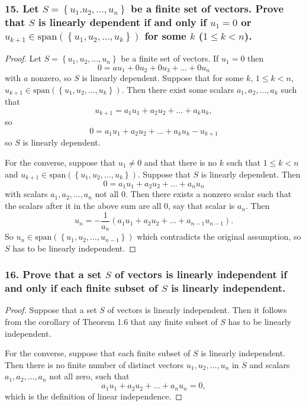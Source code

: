 \documentclass{article}
\begin{document}
\subsubsection*{15. Let $S = \left\{u_1. u_2, \dots, u_n\right\}$ be a finite set of vectors. Prove that $S$ is linearly dependent if and only if $u_1 = 0$ or $u_{k+1}\in \text{span}(\left\{u_1, u_2, \dots, u_k\right\})$ for some $k$ ($1 \le k < n$).}
\begin{proof}
	Let $S = \left\{u_1, u_2, \dots, u_n\right\}$ be a finite set of vectors. If $u_1 = 0$ then \[0 = au_1 + 0u_2 + 0u_3 + \dots + 0u_n\] with $a$ nonzero, so $S$ is linearly dependent. Suppose that for some $k$, $1 \le k < n$, $u_{k+1} \in \text{span}(\left\{u_1, u_2, \dots, u_k\right\})$. Then there exist some scalars $a_1, a_2, \dots, a_k$ such that \[u_{k+1} = a_1u_1 + a_2u_2 + \dots + a_ku_k,\] so \[0 = a_1u_1 + a_2u_2 + \dots + a_ku_k - u_{k+1}\] so $S$ is linearly dependent.

	For the converse, suppose that $u_1 \ne 0$ and that there is no $k$ such that $1 \le k < n$ and $u_{k+1} \in \text{span}(\left\{u_1, u_2, \dots, u_k\right\})$. Suppose that $S$ is linearly dependent. Then \[0 = a_1u_1 + a_2u_2 + \dots + a_nu_n\] with scalars $a_1, a_2, \dots, a_n$ not all $0$. Then there exists a nonzero scalar such that the scalars after it in the above sum are all $0$, say that scalar is $a_n$. Then \[u_n = -\frac{1}{a_n}(a_1u_1 + a_2u_2 + \dots + a_{n-1}u_{n-1}).\] So $u_n \in \text{span}(\left\{u_1, u_2, \dots, u_{n-1}\right\})$ which contradicts the original assumption, so $S$ has to be linearly independent.
\end{proof}

\subsubsection*{16. Prove that a set $S$ of vectors is linearly independent if and only if each finite subset of $S$ is linearly independent.}
\begin{proof}
	Suppose that a set $S$ of vectors is linearly independent. Then it follows from the corollary of Theorem 1.6 that any finite subset of $S$ has to be linearly independent.

	For the converse, suppose that each finite subset of $S$ is linearly independent. Then there is no finite number of distinct vectors $u_1, u_2, \dots, u_n$ in $S$ and scalars $a_1, a_2, \dots, a_n$ not all zero, such that \[a_1u_1 + a_2u_2 + \dots + a_nu_n = 0,\] which is the definition of linear independence.
\end{proof}
\end{document}
